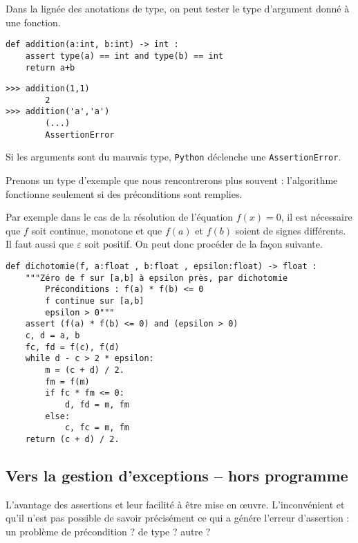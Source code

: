 \begin{exemple}
Dans la lignée des anotations de type, on peut tester le type d'argument donné à une fonction. 
\begin{minipage}[c]{.45\linewidth}
\begin{lstlisting}
def addition(a:int, b:int) -> int : 
    assert type(a) == int and type(b) == int
    return a+b
\end{lstlisting}
\end{minipage} \hfill
\begin{minipage}[c]{.45\linewidth}
\begin{lstlisting}
>>> addition(1,1)
        2
>>> addition('a','a')
        (...)
        AssertionError
\end{lstlisting}
\end{minipage} 

Si les arguments sont du mauvais type, \texttt{Python} déclenche une \texttt{AssertionError}.
\end{exemple}


\begin{exemple} Prenons un type d'exemple que nous rencontrerons plus souvent : l'algorithme fonctionne seulement si des préconditions sont remplies. 

Par exemple dans le cas de la résolution de l'équation $f(x)=0$, il est nécessaire que $f$ soit continue, monotone et que $f(a)$ et $f(b)$ soient de signes différents. Il faut aussi que $\varepsilon$ soit positif. On peut donc procéder de la façon suivante. 

\begin{lstlisting}
def dichotomie(f, a:float , b:float , epsilon:float) -> float :
    """Zéro de f sur [a,b] à epsilon près, par dichotomie
        Préconditions : f(a) * f(b) <= 0
        f continue sur [a,b]
        epsilon > 0"""
    assert (f(a) * f(b) <= 0) and (epsilon > 0)
    c, d = a, b
    fc, fd = f(c), f(d)
    while d - c > 2 * epsilon:
        m = (c + d) / 2.
        fm = f(m)
        if fc * fm <= 0:
            d, fd = m, fm
        else:
            c, fc = m, fm
    return (c + d) / 2.
\end{lstlisting}
\end{exemple}

\subsection{Vers la gestion d'exceptions -- hors programme}
L'avantage des assertions et leur facilité à être mise en \oe{}uvre. L'inconvénient et qu'il n'est pas possible de savoir précisément ce qui a génére l'erreur d'assertion : un problème de précondition ? de type ? autre ?

